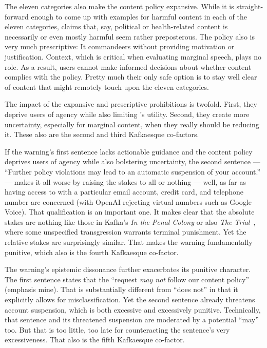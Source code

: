 The eleven categories also make the content policy expansive. While it is
straight-forward enough to come up with examples for harmful content in each of
the eleven categories, claims that, say, political or health-related content is
necessarily or even mostly harmful seem rather preposterous. The policy also is
very much prescriptive: It commandeers without providing motivation or
justification. Context, which is critical when evaluating marginal speech, plays
no role. As a result, users cannot make informed decisions about whether content
complies with the policy. Pretty much their only safe option is to stay well
clear of content that might remotely touch upon the eleven categories.

The impact of the expansive and prescriptive prohibitions is twofold. First,
they deprive users of agency while also limiting \DALLE's utility. Second, they
create more uncertainty, especially for marginal content, when they really
should be reducing it. These also are the second and third Kafkaesque
co-factors.

If the warning's first sentence lacks actionable guidance and the content policy
deprives users of agency while also bolstering uncertainty, the second sentence
--- ``Further policy violations may lead to an automatic suspension of your
account.'' --- makes it all worse by raising the stakes to all or nothing ---
well, as far as having access to \DALLE{} with a particular email account,
credit card, and telephone number are concerned (with OpenAI rejecting virtual
numbers such as Google Voice). That qualification is an important one. It makes
clear that the absolute stakes are nothing like those in Kafka's \emph{In the
Penal Colony} or also \emph{The Trial}~\cite{Kafka2005}, where some unspecified
transgression warrants terminal punishment. Yet the relative stakes are
surprisingly similar. That makes the warning fundamentally punitive, which also
is the fourth Kafkaesque co-factor.

The warning's epistemic dissonance further exacerbates its punitive character.
The first sentence states that the ``request \emph{may not} follow our content
policy'' (emphasis mine). That is substantially different from ``does not'' in
that it explicitly allows for misclassification. Yet the second sentence already
threatens account suspension, which is both excessive and excessively punitive.
Technically, that sentence and its threatened suspension are moderated by a
potential ``may'' too. But that is too little, too late for counteracting the
sentence's very excessiveness. That also is the fifth Kafkaesque co-factor.

